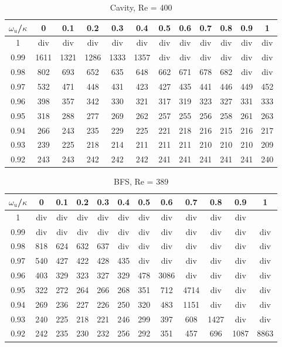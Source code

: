 \documentclass[final,3p,times,10pt,onecolumn]{myElsarticle}
\numberwithin{equation}{section}
\begin{document}
\begin{table}[t!]
\centering
\begin{tabular}{c|ccccccccccc}
\hline 
$\omega_u$/$\kappa$ & 0 & 0.1 & 0.2 & 0.3 & 0.4 & 0.5 & 0.6 & 0.7 & 0.8 & 0.9 & 1 \\ 
\hline 
1 & div & div & div & div & div & div & div & div & div & div & div \\ 
0.99 & 1611 & 1321 & 1286 & 1333 & 1357 & div & div & div & div & div & div \\ 
0.98 & 802 & 693 & 652 & 635 & 648 & 662 & 671 & 678 & 682 & div & div \\ 
0.97 & 532 & 471 & 448 & 431 & 423 & 427 & 435 & 441 & 446 & 449 & 452 \\ 
0.96 & 398 & 357 & 342 & 330 & 321 & 317 & 319 & 323 & 327 & 331 & 333 \\ 
0.95 & 318 & 288 & 277 & 269 & 262 & 257 & 255 & 256 & 258 & 261 & 263 \\ 
0.94 & 266 & 243 & 235 & 229 & 225 & 221 & 218 & 216 & 215 & 216 & 217 \\ 
0.93 & 239 & 225 & 218 & 214 & 211 & 211 & 211 & 210 & 210 & 210 & 209 \\ 
0.92 & 243 & 243 & 242 & 242 & 242 & 241 & 241 & 241 & 241 & 241 & 240 \\ 
\hline 
\end{tabular}
\caption{Cavity, Re = 400}
\label{Table:Cavity_HighRe}
\end{table}



\begin{table}[t!]
\centering
\begin{tabular}{c|ccccccccccc}
\hline 
$\omega_u$/$\kappa$ & 0 & 0.1 & 0.2 & 0.3 & 0.4 & 0.5 & 0.6 & 0.7 & 0.8 & 0.9 & 1 \\ 
\hline 
1 & div & div & div & div & div & div & div & div & div & div &  \\ 
0.99 & div & div & div & div & div & div & div & div & div & div & div \\ 
0.98 & 818 & 624 & 632 & 637 & div & div & div & div & div & div & div \\ 
0.97 & 540 & 427 & 422 & 428 & 435 & div & div & div & div & div & div \\ 
0.96 & 403 & 329 & 323 & 327 & 329 & 478 & 3086 & div & div & div & div \\ 
0.95 & 322 & 272 & 264 & 266 & 268 & 351 & 712 & 4714 & div & div & div \\ 
0.94 & 269 & 236 & 227 & 226 & 250 & 320 & 483 & 1151 & div & div & div \\ 
0.93 & 240 & 225 & 218 & 221 & 246 & 299 & 397 & 608 & 1427 & div & div \\ 
0.92 & 242 & 235 & 230 & 232 & 256 & 292 & 351 & 457 & 696 & 1087 & 8863 \\ 
\hline 
\end{tabular}
\caption{BFS, Re = 389}
\label{Table:BFS_HighRe}
\end{table}
\end{document}
